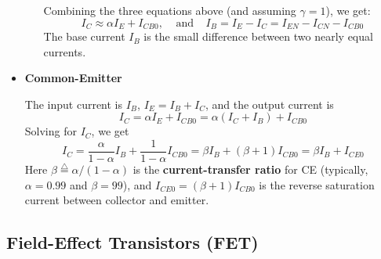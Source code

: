 \begin{itemize}
\begin{itemize}
Combining the three equations above (and assuming $\gamma=1$), we get:
\[	I_C\approx \alpha I_E + I_{CB0},\;\;\;\;\mbox{and}\;\;\;\;
	I_B=I_E-I_C=I_{EN}-I_{CN}-I_{CB0}	\]
The base current $I_B$ is the small difference between two nearly equal
currents.
\end{itemize}

\item {\bf Common-Emitter}



The input current is $I_B$, $I_E=I_B+I_C$, and the output current is 
\[ I_C=\alpha I_E+I_{CB0}=\alpha (I_C+I_B) + I_{CB0}	\]
Solving for $I_C$, we get
\[ I_C=\frac{\alpha}{1-\alpha} I_B+\frac{1}{1-\alpha} I_{CB0}
	=\beta I_B + (\beta+1) I_{CB0}=\beta I_B + I_{CE0}	\]
Here $\beta\stackrel{\triangle}{=}\alpha/(1-\alpha)$ is the 
{\bf current-transfer ratio} for CE (typically, $\alpha=0.99$ and $\beta=99$),
and $I_{CE0}=(\beta+1) I_{CB0}$ is the reverse saturation current between
collector and emitter.

\end{itemize}


\subsection*{Field-Effect Transistors (FET)}

